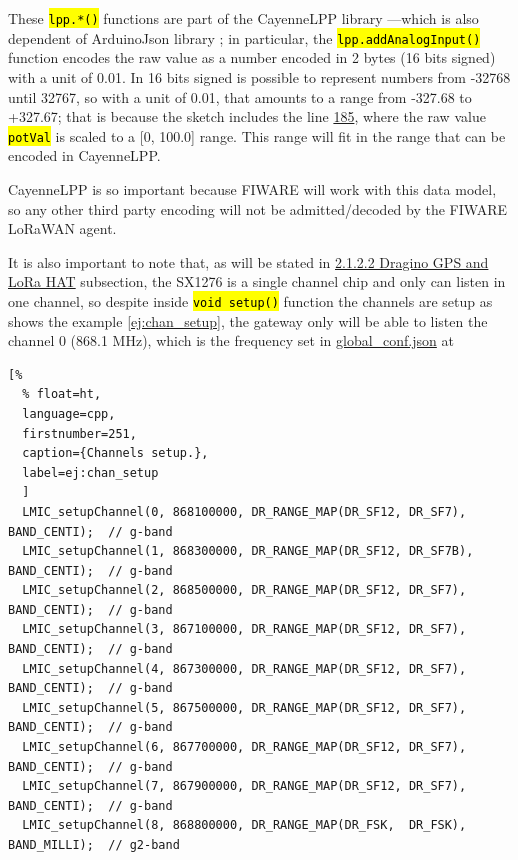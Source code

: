 \documentclass[11pt,a4paper,dvipsnames,twoside]{article}
\newcommand{\cmd}[1] {\hl{\texttt{#1}}}
\begin{document}
These \cmd{lpp.*()} functions are part of the CayenneLPP library \cite{CayenneLPP_lib} ---which is also dependent of ArduinoJson library \cite{ArduinoJson_lib}; in particular, the \cmd{lpp.addAnalogInput()} function encodes the raw value as a number encoded in 2 bytes (16 bits signed) with a unit of 0.01. In 16 bits signed is possible to represent numbers from -32768 until 32767, so with a unit of 0.01, that amounts to a range from -327.68 to +327.67; that is because the sketch includes the line \href{https://github.com/WyRe/lora-arduino-dendrometer/blob/master/src/arduino/dendro/dendro.ino#L185}{185}, where the raw value \cmd{potVal} is scaled to a [0, 100.0] range. This range will fit in the range that can be encoded in CayenneLPP. 

CayenneLPP is so important because FIWARE will work with this data model, so any other third party encoding will not be admitted/decoded by the FIWARE LoRaWAN agent.

It is also important to note that, as will be stated in \hyperlink{Raspi_HAT}{2.1.2.2 Dragino GPS and LoRa HAT} subsection, the SX1276 is a single channel chip and only can listen in one channel, so despite inside \cmd{void setup()} function the channels are setup as shows the example \ref{ej:chan_setup}, the gateway only will be able to listen the channel 0 (868.1 \si{\mega\hertz}), which is the frequency set in \href{https://github.com/dragino/dual_chan_pkt_fwd/blob/master/global_conf.json}{global\_conf.json} at \cite{Dragino_DualChannelController_Rpi}

\begin{lstlisting}[%
  % float=ht,
  language=cpp,
  firstnumber=251,
  caption={Channels setup.},
  label=ej:chan_setup
  ]
  LMIC_setupChannel(0, 868100000, DR_RANGE_MAP(DR_SF12, DR_SF7),  BAND_CENTI);  // g-band
  LMIC_setupChannel(1, 868300000, DR_RANGE_MAP(DR_SF12, DR_SF7B), BAND_CENTI);  // g-band
  LMIC_setupChannel(2, 868500000, DR_RANGE_MAP(DR_SF12, DR_SF7),  BAND_CENTI);  // g-band
  LMIC_setupChannel(3, 867100000, DR_RANGE_MAP(DR_SF12, DR_SF7),  BAND_CENTI);  // g-band
  LMIC_setupChannel(4, 867300000, DR_RANGE_MAP(DR_SF12, DR_SF7),  BAND_CENTI);  // g-band
  LMIC_setupChannel(5, 867500000, DR_RANGE_MAP(DR_SF12, DR_SF7),  BAND_CENTI);  // g-band
  LMIC_setupChannel(6, 867700000, DR_RANGE_MAP(DR_SF12, DR_SF7),  BAND_CENTI);  // g-band
  LMIC_setupChannel(7, 867900000, DR_RANGE_MAP(DR_SF12, DR_SF7),  BAND_CENTI);  // g-band
  LMIC_setupChannel(8, 868800000, DR_RANGE_MAP(DR_FSK,  DR_FSK),  BAND_MILLI);  // g2-band
\end{lstlisting}
\end{document}
